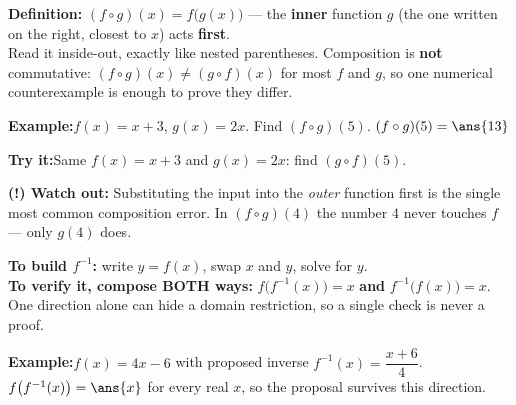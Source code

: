 \documentclass[12pt]{article}
\begin{document}


\begin{formulabox}
\textbf{Definition:} $(f \circ g)(x) = f\bigl(g(x)\bigr)$ --- the \textbf{inner}
function $g$ (the one written on the right, closest to $x$) acts
\textbf{first}.\\[3pt]
Read it inside-out, exactly like nested parentheses. Composition is \textbf{not}
commutative: $(f \circ g)(x) \neq (g \circ f)(x)$ for most $f$ and $g$, so one
numerical counterexample is enough to prove they differ.
\end{formulabox}

\begin{examplebox}
\textbf{Example:}\quad $f(x) = x + 3$, $g(x) = 2x$. Find $(f \circ g)(5)$.
$(f \circ g)(5) = \ans{13}$
\end{examplebox}

\begin{tryitbox}
\textbf{Try it:}\quad Same $f(x) = x + 3$ and $g(x) = 2x$: find
$(g \circ f)(5)$.\\[2pt]
\end{tryitbox}

\begin{watchoutbox}
\textbf{(!) Watch out:} Substituting the input into the \emph{outer} function
first is the single most common composition error. In $(f \circ g)(4)$ the
number $4$ never touches $f$ --- only $g(4)$ does.
\end{watchoutbox}


\begin{formulabox}
\textbf{To build $f^{-1}$:} write $y = f(x)$, swap $x$ and $y$, solve for
$y$.\\[3pt]
\textbf{To verify it, compose BOTH ways:}
$f\bigl(f^{-1}(x)\bigr) = x$ \; \textbf{and} \; $f^{-1}\bigl(f(x)\bigr) = x$.\\
One direction alone can hide a domain restriction, so a single check is never a
proof.
\end{formulabox}

\begin{examplebox}
\textbf{Example:}\quad $f(x) = 4x - 6$ with proposed inverse $f^{-1}(x) = \dfrac{x + 6}{4}$.
$f\bigl(f^{-1}(x)\bigr) = \ans{x}$ for every real $x$, so the proposal survives this direction.
\end{examplebox}
\end{document}
